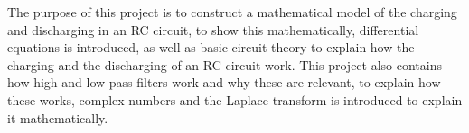 The purpose of this project is to construct a mathematical model of the charging and discharging in an RC circuit, to show this mathematically, differential equations is introduced, as well as basic circuit theory to explain how the charging and the discharging of an RC circuit work. This project also contains how high and low-pass filters work and why these are relevant, to explain how these works, complex numbers and the Laplace transform is introduced to explain it mathematically. 
